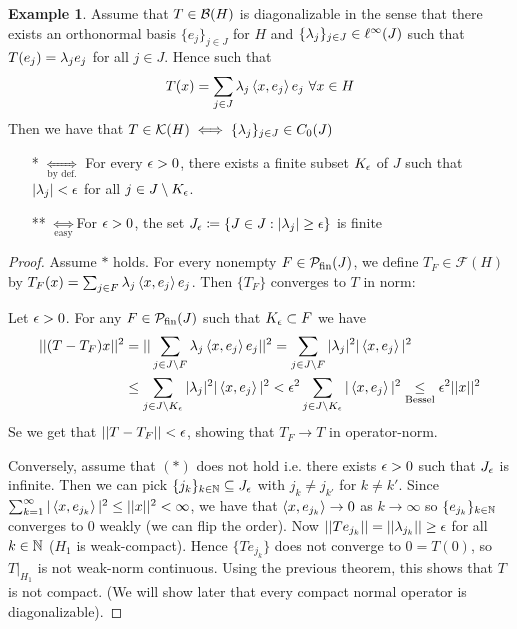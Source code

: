 \documentclass[10pt,english,a4paper]{article}
\theoremstyle{definition}
\newtheorem*{example}{Example}
\def\Psfin{\mathcal{P}_{\textnormal{fin}}}
\def\Ff{\mathcal{F}}
\def\Kf{\mathcal{K}}
\begin{document}
\begin{example}
    Assume that $T \in \mathcal{B}(H)$ is diagonalizable in the sense that there exists 
an orthonormal basis $\{e_j\}_{j \in J}$ for $H$ and $\{\lambda_j\}_{j\in J} \in
\ell^{\infty}(J)$ such that $T(e_j) = \lambda_je_j$ for all $j\in J$. Hence such that 
\[ T(x) = \sum_{j \in J} \lambda_{j}\left\langle x, e_j \right\rangle e_j ~\forall x \in H \]
Then we have that $T \in \Kf(H)\iff \{\la_j\}_{j\in J} \in C_{0}(J)$ 
\begin{itemize}
    \item[*] $\underset{\text{by def.}}{\iff}$ For every $\epsilon >0$, there exists
    a finite subset $K_{\epsilon}$ of $J$ such that $|\lambda_j|<\epsilon$ for all $j\in
    J\setminus K_{\epsilon}$.

    \item[**] $\underset{\text{easy}}{\iff}$For $\epsilon >0$, the set $J_{\epsilon}\coloneqq \{ J \in J : |\lambda_j| \geq \epsilon\}$
    is finite
\end{itemize}
\begin{proof}
   Assume $*$ holds. For every nonempty $F \in \Psfin(J)$, we define $T_F \in \Ff(H)$
by $T_{F}(x) = \sum_{j \in F}\lambda_j\left\langle x,e_j \right\rangle e_j$. Then $\{T_F\}$ converges to 
$T$ in norm: 

Let $\epsilon>0$. For any $F \in \Psfin(J)$
such that $K_{\epsilon} \subset F$ we have 
\begin{align*}
||(T-T_F)x||^2 &= ||\sum_{j\in J\setminus F}\lambda_j\left\langle x,e_j \right\rangle e_j||^2 
= \sum_{j\in J\setminus F} |\lambda_j|^2 |\left\langle x,e_j \right\rangle|^2 \\
&\leq \sum_{j\in J\setminus K_{\epsilon}} |\lambda_j|^2 |\left\langle x,e_j \right\rangle|^2 
< \epsilon^2 \sum_{j \in J\setminus K_{\epsilon}}|\left\langle x,e_j \right\rangle|^2 \underset{\text{Bessel}}{\leq}\epsilon^2 ||x||^2
\end{align*}
Se we get that $||T-T_F|| < \epsilon$, showing that $T_F \to T$ in operator-norm. 

Conversely, assume that $(*)$ does not hold i.e. there exists $\epsilon>0$ such that 
$J_{\epsilon}$ is infinite. Then we can pick $\{j_k\}_{k\in \mathbb{N}} \subseteq J_{\epsilon}$
with $j_k \neq j_{k'}$ for $k\neq k'$. Since $\sum_{k=1}^{\infty}
|\left\langle x,e_{j_k} \right\rangle|^2 \leq ||x||^2 <\infty$, we have that $\left\langle x,e_{j_k} \right\rangle \to 0$
as $k\to \infty$ so $\{e_{j_k}\}_{k\in \mathbb{N}}$ converges to 0 weakly (we can flip the order). 
Now $||Te_{j_k}|| = ||\lambda_{j_k}|| \geq \epsilon$ for all $k \in \mathbb{N}$ ($H_1$ is weak-compact). Hence $\{Te_{j_k}\}$
does not converge to $0 = T(0)$, so $T\lvert_{H_1}$ is not weak-norm continuous. 
Using the previous theorem, this shows that $T$ is not compact. (We will show later that 
every compact normal operator is diagonalizable).
\end{proof}
\end{example}
\end{document}
